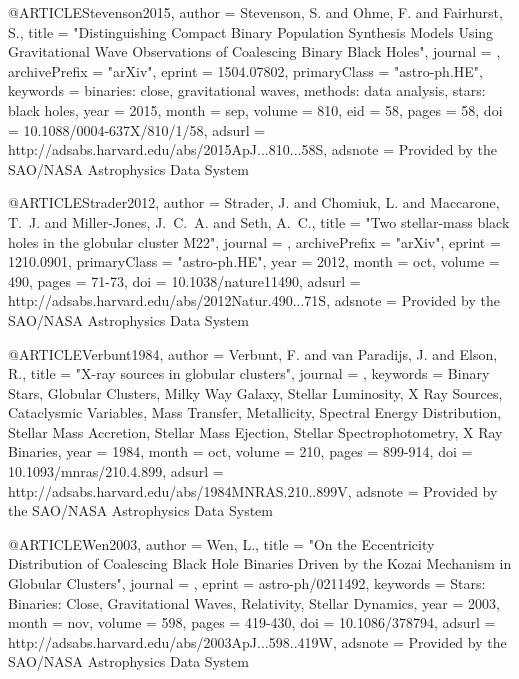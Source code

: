 \documentclass[twocolumn,tighten]{aastex63}
\begin{document}
{{{{{{@ARTICLE{Stevenson2015,
   author = {{Stevenson}, S. and {Ohme}, F. and {Fairhurst}, S.},
    title = "{Distinguishing Compact Binary Population Synthesis Models Using Gravitational Wave Observations of Coalescing Binary Black Holes}",
  journal = {\apj},
archivePrefix = "arXiv",
   eprint = {1504.07802},
 primaryClass = "astro-ph.HE",
 keywords = {binaries: close, gravitational waves, methods: data analysis, stars: black holes},
     year = 2015,
    month = sep,
   volume = 810,
      eid = {58},
    pages = {58},
      doi = {10.1088/0004-637X/810/1/58},
   adsurl = {http://adsabs.harvard.edu/abs/2015ApJ...810...58S},
  adsnote = {Provided by the SAO/NASA Astrophysics Data System}
}

@ARTICLE{Strader2012,
   author = {{Strader}, J. and {Chomiuk}, L. and {Maccarone}, T.~J. and {Miller-Jones}, J.~C.~A. and 
	{Seth}, A.~C.},
    title = "{Two stellar-mass black holes in the globular cluster M22}",
  journal = {\nat},
archivePrefix = "arXiv",
   eprint = {1210.0901},
 primaryClass = "astro-ph.HE",
     year = 2012,
    month = oct,
   volume = 490,
    pages = {71-73},
      doi = {10.1038/nature11490},
   adsurl = {http://adsabs.harvard.edu/abs/2012Natur.490...71S},
  adsnote = {Provided by the SAO/NASA Astrophysics Data System}
}

@ARTICLE{Verbunt1984,
   author = {{Verbunt}, F. and {van Paradijs}, J. and {Elson}, R.},
    title = "{X-ray sources in globular clusters}",
  journal = {\mnras},
 keywords = {Binary Stars, Globular Clusters, Milky Way Galaxy, Stellar Luminosity, X Ray Sources, Cataclysmic Variables, Mass Transfer, Metallicity, Spectral Energy Distribution, Stellar Mass Accretion, Stellar Mass Ejection, Stellar Spectrophotometry, X Ray Binaries},
     year = 1984,
    month = oct,
   volume = 210,
    pages = {899-914},
      doi = {10.1093/mnras/210.4.899},
   adsurl = {http://adsabs.harvard.edu/abs/1984MNRAS.210..899V},
  adsnote = {Provided by the SAO/NASA Astrophysics Data System}
}

@ARTICLE{Wen2003,
   author = {{Wen}, L.},
    title = "{On the Eccentricity Distribution of Coalescing Black Hole Binaries Driven by the Kozai Mechanism in Globular Clusters}",
  journal = {\apj},
   eprint = {astro-ph/0211492},
 keywords = {Stars: Binaries: Close, Gravitational Waves, Relativity, Stellar Dynamics},
     year = 2003,
    month = nov,
   volume = 598,
    pages = {419-430},
      doi = {10.1086/378794},
   adsurl = {http://adsabs.harvard.edu/abs/2003ApJ...598..419W},
  adsnote = {Provided by the SAO/NASA Astrophysics Data System}
}

}}}}}}
\end{document}
